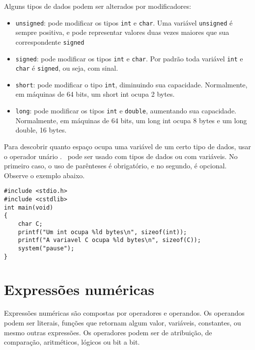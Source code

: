 Alguns tipos de dados podem ser alterados por modificadores:

\begin{itemize}
\item {\tt unsigned}: pode modificar os tipos {\tt int} e {\tt char}. Uma variável {\tt unsigned} é sempre positiva, e pode representar valores duas vezes maiores que sua correspondente {\tt signed}
\item {\tt signed}: pode modificar os tipos {\tt int} e {\tt char}. 
Por padrão toda variável {\tt int} e {\tt char} é {\tt signed}, ou seja, com sinal.
\item {\tt short}: pode modificar o tipo {\tt int}, diminuindo sua capacidade. Normalmente, em máquinas de 64 bits, um short int ocupa 2 bytes.
\item {\tt long}: pode modificar os tipos {\tt int} e {\tt double}, aumentando sua capacidade. Normalmente, em máquinas de 64 bits, um long int ocupa 8 bytes e um long double, 16 bytes.

\end{itemize}

Para descobrir quanto espaço ocupa uma variável de um certo tipo de dados, usar o operador unário \SIZEOF. \SIZEOF\ pode ser usado com tipos de dados ou com variáveis. No primeiro caso, o uso de parênteses é obrigatório, e no segundo, é opcional. Observe o exemplo abaixo.

\begin{lstlisting}
#include <stdio.h>
#include <cstdlib>
int main(void)
{
    char C;
    printf("Um int ocupa %ld bytes\n", sizeof(int));
    printf("A variavel C ocupa %ld bytes\n", sizeof(C));
    system("pause");
}
\end{lstlisting}





\section{Expressões numéricas}
\label{sec:expr}

Expressões numéricas são compostas por operadores e operandos. Os operandos podem ser literais, funções que retornam algum valor, variáveis, constantes, ou mesmo outras expressões. Os operadores podem ser de atribuição, de comparação, aritméticos, lógicos ou bit a bit.

